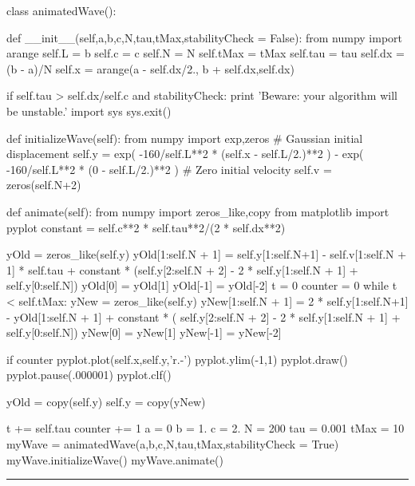 \begin{codeexample}
\begin{VerbatimOut}{\listingFile}

class animatedWave():

    def __init__(self,a,b,c,N,tau,tMax,stabilityCheck = False):
        from numpy import arange
        self.L = b
        self.c = c
        self.N = N
        self.tMax = tMax
        self.tau = tau
        self.dx = (b - a)/N
        self.x = arange(a - self.dx/2., b + self.dx,self.dx)
        
        if self.tau > self.dx/self.c and stabilityCheck:
            print 'Beware: your algorithm will be unstable.'
            import sys
            sys.exit()


    def initializeWave(self):
        from numpy import exp,zeros
        # Gaussian initial displacement
        self.y = exp( -160/self.L**2 * (self.x - self.L/2.)**2 ) - exp( -160/self.L**2 * (0 - self.L/2.)**2 )
        # Zero initial velocity
        self.v = zeros(self.N+2)


    def animate(self):
        from numpy import zeros_like,copy
        from matplotlib import pyplot
        constant = self.c**2 * self.tau**2/(2 * self.dx**2)

        yOld = zeros_like(self.y)
        yOld[1:self.N + 1] = self.y[1:self.N+1] - self.v[1:self.N + 1] * self.tau + constant * (self.y[2:self.N + 2] - 2 * self.y[1:self.N + 1] + self.y[0:self.N])
        yOld[0] = yOld[1]
        yOld[-1] = yOld[-2]
        t = 0
        counter = 0
        while t < self.tMax:
            yNew = zeros_like(self.y)
            yNew[1:self.N + 1] = 2 * self.y[1:self.N+1] - yOld[1:self.N + 1] + constant * ( self.y[2:self.N + 2] - 2 * self.y[1:self.N + 1] + self.y[0:self.N])
            yNew[0] =  yNew[1]
            yNew[-1] =  yNew[-2]

            if counter %
                pyplot.plot(self.x,self.y,'r.-')
                pyplot.ylim(-1,1)
                pyplot.draw()
                pyplot.pause(.000001)
                pyplot.clf()


            yOld = copy(self.y)
            self.y = copy(yNew)


            t += self.tau
            counter += 1
a = 0
b = 1.
c = 2.
N = 200
tau = 0.001
tMax = 10
myWave = animatedWave(a,b,c,N,tau,tMax,stabilityCheck = True)
myWave.initializeWave()
myWave.animate()
\end{VerbatimOut}
\end{codeexample}
\else
\noindent\rule{5 in}{0.01 in}
\fi

